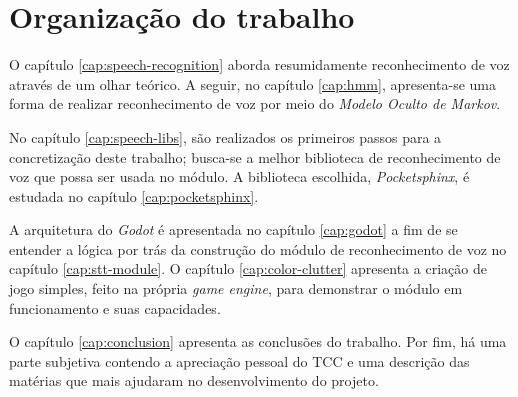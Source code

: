 
\section{Organização do trabalho}

O capítulo \ref{cap:speech-recognition} aborda resumidamente reconhecimento de voz através de um olhar teórico. A seguir, no capítulo \ref{cap:hmm}, apresenta-se uma forma de realizar reconhecimento de voz por meio do \textit{Modelo Oculto de Markov}.

No capítulo \ref{cap:speech-libs}, são realizados os primeiros passos para a concretização deste trabalho; busca-se a melhor biblioteca de reconhecimento de voz que possa ser usada no módulo. A biblioteca escolhida, \textit{Pocketsphinx}, é estudada no capítulo \ref{cap:pocketsphinx}.

A arquitetura do \textit{Godot} é apresentada no capítulo \ref{cap:godot} a fim de se entender a lógica por trás da construção do módulo de reconhecimento de voz no capítulo \ref{cap:stt-module}. O capítulo \ref{cap:color-clutter} apresenta a criação de jogo simples, feito na própria \textit{game engine}, para demonstrar o módulo em funcionamento e suas capacidades.

O capítulo \ref{cap:conclusion} apresenta as conclusões do trabalho. Por fim, há uma parte subjetiva contendo a apreciação pessoal do TCC e uma descrição das matérias que mais ajudaram no desenvolvimento do projeto.
